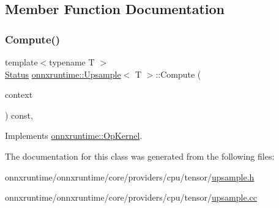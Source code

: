 \subsection{Member Function Documentation}
\mbox{\label{classonnxruntime_1_1Upsample_a6c82c4d2350ce04f0222e1185294ae59}} 
\subsubsection{\texorpdfstring{Compute()}{Compute()}}
{\footnotesize\ttfamily template$<$typename T $>$ \\
\mbox{\hyperlink{classonnxruntime_1_1common_1_1Status}{Status}} \mbox{\hyperlink{classonnxruntime_1_1Upsample}{onnxruntime\+::\+Upsample}}$<$ T $>$\+::Compute (\begin{DoxyParamCaption}\item[{\mbox{\hyperlink{classonnxruntime_1_1OpKernelContext}{Op\+Kernel\+Context}} $\ast$}]{context }\end{DoxyParamCaption}) const\hspace{0.3cm}{\ttfamily [override]}, {\ttfamily [virtual]}}



Implements \mbox{\hyperlink{classonnxruntime_1_1OpKernel_a9eca8656a78b1b3ab9d3351a12798650}{onnxruntime\+::\+Op\+Kernel}}.



The documentation for this class was generated from the following files\+:\begin{DoxyCompactItemize}
\item 
onnxruntime/onnxruntime/core/providers/cpu/tensor/\mbox{\hyperlink{cpu_2tensor_2upsample_8h}{upsample.\+h}}\item 
onnxruntime/onnxruntime/core/providers/cpu/tensor/\mbox{\hyperlink{cpu_2tensor_2upsample_8cc}{upsample.\+cc}}\end{DoxyCompactItemize}
